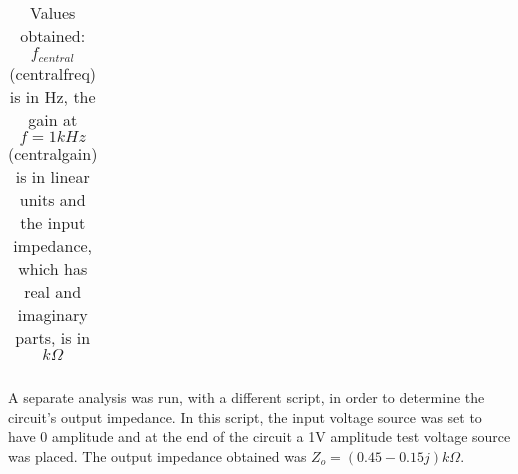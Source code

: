 \begin{table}[H]
  \centering
  \begin{tabular}{|c|c|}
    \hline
      
  \end{tabular}
  \caption{Values obtained: $f_{central}$ (centralfreq) is in Hz, the gain at $f = 1 kHz$ (centralgain) is in linear units and the input impedance, which has real and imaginary parts, is in $k\Omega$}
  \label{tab:resultssim}
\end{table}

A separate analysis was run, with a different script, in order to determine the circuit's output impedance. In this script, the input voltage source was set to have 0 amplitude and at the end of the circuit a 1V amplitude test voltage source was placed. The output impedance obtained was $Z_o = (0.45 - 0.15j) k\Omega$.





